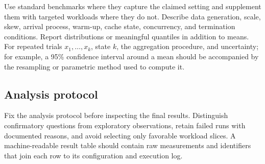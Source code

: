 Use standard benchmarks where they capture the claimed setting and supplement
them with targeted workloads where they do not.  Describe data generation,
scale, skew, arrival process, warm-up, cache state, concurrency, and termination
conditions.  Report distributions or meaningful quantiles in addition to
means.  For repeated trials $x_1,\ldots,x_k$, state $k$, the aggregation
procedure, and uncertainty; for example, a 95\% confidence interval around a
mean should be accompanied by the resampling or parametric method used to
compute it.

\subsection{Analysis protocol}

Fix the analysis protocol before inspecting the final results.  Distinguish
confirmatory questions from exploratory observations, retain failed runs with
documented reasons, and avoid selecting only favorable workload slices.  A
machine-readable result table should contain raw measurements and identifiers
that join each row to its configuration and execution log.
